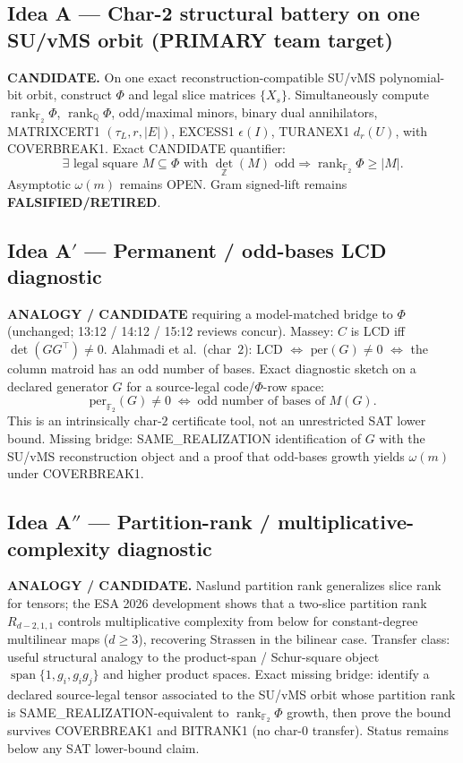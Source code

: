 \documentclass[11pt]{article}
\begin{document}
\subsection*{Idea A --- Char-2 structural battery on one SU/vMS orbit (PRIMARY team target)}
\textbf{CANDIDATE.} On one exact reconstruction-compatible SU/vMS polynomial-bit orbit, construct
$\Phi$ and legal slice matrices $\{X_s\}$. Simultaneously compute
$\operatorname{rank}_{\mathbb F_2}\Phi$, $\operatorname{rank}_{\mathbb Q}\Phi$, odd/maximal minors,
binary dual annihilators, MATRIXCERT1 $(\tau_L,r,|E|)$, EXCESS1 $\epsilon(I)$, TURANEX1 $d_r(U)$,
with COVERBREAK1. Exact CANDIDATE quantifier:
\[
\exists\text{ legal square }M\subseteq\Phi\text{ with }\det_{\mathbb Z}(M)\text{ odd}
\Rightarrow\operatorname{rank}_{\mathbb F_2}\Phi\ge|M|.
\]
Asymptotic $\omega(m)$ remains OPEN. Gram signed-lift remains \textbf{FALSIFIED/RETIRED}.

\subsection*{Idea A$'$ --- Permanent / odd-bases LCD diagnostic}
\textbf{ANALOGY / CANDIDATE} requiring a model-matched bridge to $\Phi$ (unchanged;
13:12 / 14:12 / 15:12 reviews concur). Massey: $C$ is LCD iff $\det(GG^\top)\neq 0$.
Alahmadi et al.\ (char~$2$): LCD $\Leftrightarrow$ $\mathrm{per}(G)\neq 0$ $\Leftrightarrow$ the column matroid
has an odd number of bases. Exact diagnostic sketch on a declared generator $G$ for a
source-legal code/$\Phi$-row space:
\[
\mathrm{per}_{\mathbb F_2}(G)\neq 0\;\Leftrightarrow\;\text{odd number of bases of }M(G).
\]
This is an intrinsically char-$2$ certificate tool, not an unrestricted SAT lower bound.
Missing bridge: SAME\_REALIZATION identification of $G$ with the SU/vMS reconstruction
object and a proof that odd-bases growth yields $\omega(m)$ under COVERBREAK1.

\subsection*{Idea A$''$ --- Partition-rank / multiplicative-complexity diagnostic}
\textbf{ANALOGY / CANDIDATE.} Naslund partition rank generalizes slice rank for tensors;
the ESA 2026 development shows that a two-slice partition rank $R_{d-2,1,1}$ controls
multiplicative complexity from below for constant-degree multilinear maps ($d\ge 3$),
recovering Strassen in the bilinear case. Transfer class: useful structural analogy to
the product-span / Schur-square object $\operatorname{span}\{1,g_i,g_ig_j\}$ and higher
product spaces. Exact missing bridge: identify a declared source-legal tensor associated
to the SU/vMS orbit whose partition rank is SAME\_REALIZATION-equivalent to
$\operatorname{rank}_{\mathbb F_2}\Phi$ growth, then prove the bound survives COVERBREAK1
and BITRANK1 (no char-$0$ transfer). Status remains below any SAT lower-bound claim.
\end{document}
